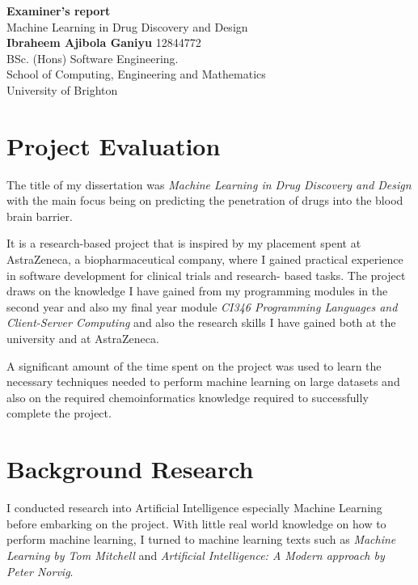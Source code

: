 \documentclass[a4paper,12pt]{article}
\begin{document}
\begin{titlepage}
	\begin{center}
		\huge
		\textbf{Examiner's report\\}
		\vspace{0.5cm}
		\Large
		Machine Learning in Drug Discovery and Design \\
		\vspace{1.5cm}
		\textbf{Ibraheem Ajibola Ganiyu}
		\vfill
		\textsc{12844772} \\
		BSc. (Hons) Software Engineering. \\
		\vspace{0.8cm}
		\large
		School of Computing, Engineering and Mathematics \\
		University of Brighton \\
		\date{\today}
	\end{center}
\end{titlepage}

\tableofcontents
\newpage
{}

\section{Project Evaluation}
	The title of my dissertation was \textit{Machine Learning in Drug Discovery and Design} with the main focus being on predicting the penetration of drugs into the blood brain barrier.
	
	It is a research-based project that is inspired by my placement spent at AstraZeneca, a biopharmaceutical company, where I gained practical experience in software development for clinical trials and research- based tasks. The project draws on the knowledge I have gained from my programming modules in the second year and also my final year module \textit{CI346 Programming Languages and Client-Server Computing} and also the research skills I have gained both at the university and at AstraZeneca.
	
	A significant amount of the time spent on the project was used to learn the necessary techniques needed to perform machine learning on large datasets and also on the required chemoinformatics knowledge required to successfully complete the project.
	
\section{Background Research}
	I conducted research into Artificial Intelligence especially Machine Learning before embarking on the project. With little real world knowledge on how to perform machine learning, I turned to machine learning texts such as \textit{Machine Learning by Tom Mitchell} and \textit{Artificial Intelligence: A Modern approach by Peter Norvig}. 
	
\end{document}

